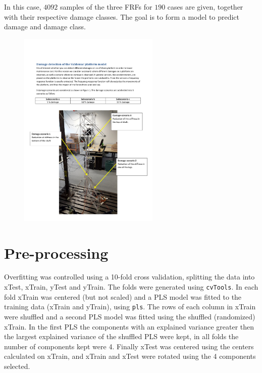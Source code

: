 \documentclass[a4paper,draft=false]{scrreprt}\usepackage[]{graphicx}\usepackage[]{color}
\begin{document}
In this case, $4092$ samples of the three FRFs for $190$ cases are given, together with their respective damage classes. The goal is to form a model to predict damage and damage class.

\begin{figure}[hb]
\begin{center}
\includegraphics[width=0.6\textwidth]{Valdemarplatform}
\end{center}
\end{figure}

{\let\clearpage\relax \chapter{Pre-processing}}
Overfitting was controlled using a 10-fold cross validation, splitting the data into xTest, xTrain, yTest and yTrain. The folds were generated using \verb+cvTools+\cite{cvTools}. In each fold xTrain was centered (but not scaled) and a PLS model was fitted to the training data (xTrain and yTrain), using \verb+pls+\cite{pls}. The rows of each column in xTrain were shuffled and a second PLS model was fitted using the shuffled (randomized) xTrain. In the first PLS the components with an explained variance greater then the largest explained variance of the shuffled PLS were kept, in all folds the number of components kept were 4. Finally xTest was centered using the centers calculated on xTrain, and xTrain and xTest were rotated using the 4 components selected. 
\end{document}
